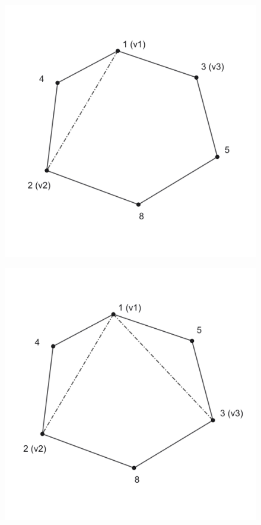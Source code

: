 \documentclass[12pt]{article}
\begin{document}
\begin{figure}
\centering
\begin{minipage}{.5\textwidth}
  \centering
  \captionsetup{width=.8\linewidth}
  \includegraphics[width=\linewidth]{triangulation1.png}
  \label{fig:test1}
\end{minipage}%
\begin{minipage}{.5\textwidth}
  \centering
  \captionsetup{width=.8\linewidth}
  \includegraphics[width=\linewidth]{triangulation2.png}
  \label{fig:test2}
\end{minipage}
\end{figure}
\end{document}
